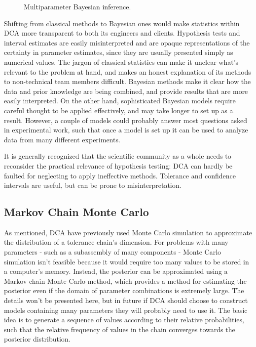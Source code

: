 \documentclass[11pt,a4paper,article]{memoir} %
\begin{document}
\begin{figure}
\centering
{}
\caption{Multiparameter Bayesian inference.}
\label{fig:multiparameter_bayes}
\end{figure}

Shifting from classical methods to Bayesian ones would make statistics within DCA more transparent to both its engineers and clients. Hypothesis tests and interval estimates are easily misinterpreted and are opaque representations of the certainty in parameter estimates, since they are usually presented simply as numerical values. The jargon of classical statistics can make it unclear what's relevant to the problem at hand, and makes an honest explanation of its methods to non-technical team members difficult. Bayesian methods make it clear how the data and prior knowledge are being combined, and provide results that are more easily interpreted. On the other hand, sophisticated Bayesian models require careful thought to be applied effectively, and  may take longer to set up as a result. However, a couple of models could probably answer most questions asked in experimental work, such that once a model is set up it can be used to analyze data from many different experiments.
\par
It is generally recognized that the scientific community as a whole needs to reconsider the practical relevance of hypothesis testing: DCA can hardly be faulted for neglecting to apply ineffective methods. Tolerance and confidence intervals are useful, but can be prone to misinterpretation. 

\subsection*{Markov Chain Monte Carlo}
As mentioned, DCA have previously used Monte Carlo simulation to approximate the distribution of a tolerance chain's dimension. For problems with many parameters - such as a subassembly of many components - Monte Carlo simulation isn't feasible because it would require too many values to be stored in a computer's memory. Instead, the posterior can be approximated using a Markov chain Monte Carlo method, which provides a method for estimating the posterior even if the domain of parameter combinations is extremely large. The details won't be presented here, but in future if DCA should choose to construct models containing many parameters they will probably need to use it. The basic idea is to generate a sequence of values according to their relative probabilities, such that the relative frequency of values in the chain converges towards the posterior distribution. 
\end{document}
